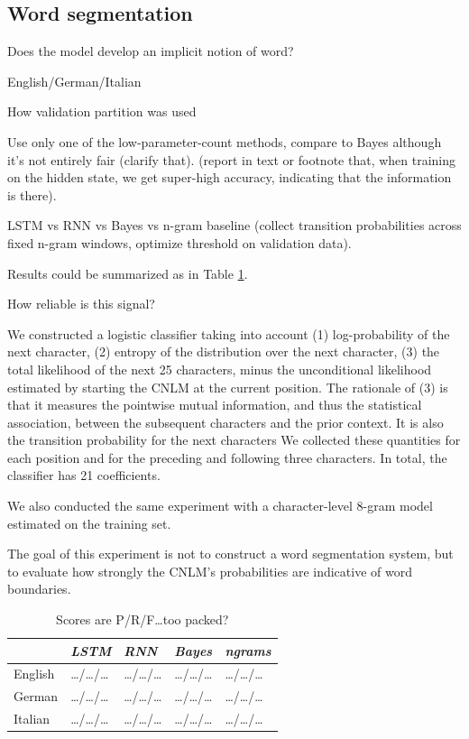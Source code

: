\subsection{Word segmentation}
\label{sec:segmentation}


Does the model develop an implicit notion of word?

English/German/Italian

How validation partition was used

Use only one of the low-parameter-count methods, compare to Bayes
although it's not entirely fair (clarify that). (report in text or
footnote that, when training on the hidden state, we get super-high
accuracy, indicating that the information is there).

LSTM vs RNN vs Bayes vs n-gram baseline (collect transition
probabilities across fixed n-gram windows, optimize threshold on
validation data).

Results could be summarized as in Table \ref{tab:segmentation-results}.

How reliable is this signal?


We constructed a logistic classifier taking into account (1) log-probability of the next character, (2) entropy of the distribution over the next character, (3) the total likelihood of the next 25 characters, minus the unconditional likelihood estimated by starting the CNLM at the current position.
The rationale of (3) is that it measures the pointwise mutual information, and thus the statistical association, between the subsequent characters and the prior context.
It is also the transition probability for the next characters
We collected these quantities for each position and for the preceding and following three characters.
In total, the classifier has 21 coefficients.

We also conducted the same experiment with a character-level 8-gram model estimated on the training set.

The goal of this experiment is not to construct a word segmentation system, but to evaluate how strongly the CNLM's probabilities are indicative of word boundaries.

\begin{table}[t]
  \begin{center}
    \begin{tabular}{l|l|l|l|l}
      \multicolumn{1}{c}{}&\emph{LSTM}&\emph{RNN}&\emph{Bayes}&\emph{ngrams}\\
      \hline
      English &\ldots{}/\ldots{}/\ldots & \ldots{}/\ldots{}/\ldots & \ldots{}/\ldots{}/\ldots &\ldots{}/\ldots{}/\ldots\\
      German &\ldots{}/\ldots{}/\ldots & \ldots{}/\ldots{}/\ldots & \ldots{}/\ldots{}/\ldots &\ldots{}/\ldots{}/\ldots\\
      Italian &\ldots{}/\ldots{}/\ldots & \ldots{}/\ldots{}/\ldots & \ldots{}/\ldots{}/\ldots &\ldots{}/\ldots{}/\ldots\\
    \end{tabular}
  \end{center}
  \caption{\label{tab:segmentation-results} Scores are P/R/F\ldots too packed?}
\end{table}


